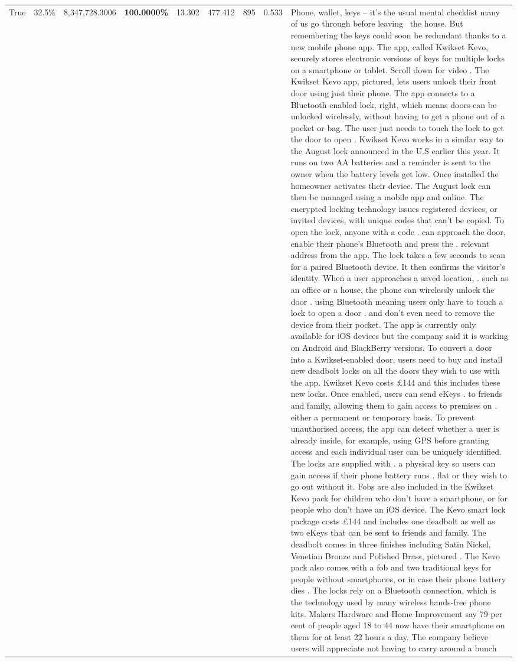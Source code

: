 \begin{table}[H]
\begin{tabular}{lllrlllll}
True & 32.5\% & 8,347,728.3006 & \bfseries \color{red} 100.0000\% & 13.302 & 477.412 & 895 & 0.533 & Phone, wallet, keys – it’s the usual mental checklist many of us go through before leaving  the house. But remembering the keys could soon be redundant thanks to a new mobile phone app. The app, called Kwikset Kevo, securely stores electronic versions of keys for multiple locks on a smartphone or tablet. Scroll down for video . The Kwikset Kevo app, pictured, lets users unlock their front door using just their phone. The app connects to a Bluetooth enabled lock, right, which means doors can be unlocked wirelessly, without having to get a phone out of a pocket or bag. The user just needs to touch the lock to get the door to open . Kwikset Kevo works in a similar way to the August lock announced in the U.S earlier this year. It runs on two AA batteries and a reminder is sent to the owner when the battery levels get low. Once installed the homeowner activates their device. The August lock can then be managed using a mobile app and online. The encrypted locking technology issues registered devices, or invited devices, with unique codes that can't be copied. To open the lock, anyone with a code . can approach the door, enable their phone's Bluetooth and press the . relevant address from the app. The lock takes a few seconds to scan for a paired Bluetooth device. It then confirms the visitor's identity. When a user approaches a saved location, . such as an office or a house, the phone can wirelessly unlock the door . using Bluetooth meaning users only have to touch a lock to open a door . and don't even need to remove the device from their pocket. The app is currently only available for iOS devices but the company said it is working on Android and BlackBerry versions. To convert a door into a Kwikset-enabled door, users need to buy and install new deadbolt locks on all the doors they wish to use with the app. Kwikset Kevo costs £144 and this includes these new locks. Once enabled, users can send eKeys . to friends and family, allowing them to gain access to premises on . either a permanent or temporary basis. To prevent unauthorised access, the app can detect whether a user is already inside, for example, using GPS before granting access and each individual user can be uniquely identified. The locks are supplied with . a physical key so users can gain access if their phone battery runs . flat or they wish to go out without it. Fobs are also included in the Kwikset Kevo pack for children who don't have a smartphone, or for people who don't have an iOS device. The Kevo smart lock package costs £144 and includes one deadbolt as well as two eKeys that can be sent to friends and family. The deadbolt comes in three finishes including Satin Nickel, Venetian Bronze and Polished Brass, pictured . The Kevo pack also comes with a fob and two traditional keys for people without smartphones, or in case their phone battery dies . The locks rely on a Bluetooth connection, which is the technology used by many wireless hands-free phone kits. Makers Hardware and Home Improvement say 79 per cent of people aged 18 to 44 now have their smartphone on them for at least 22 hours a day. The company believe users will appreciate not having to carry around a bunch 
\end{tabular}
\end{table}
